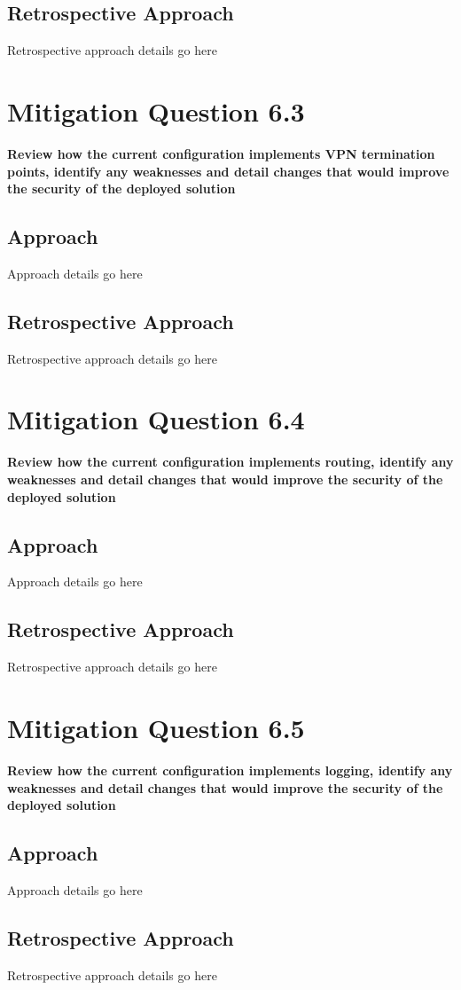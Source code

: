 \subsection{Retrospective Approach}
Retrospective approach details go here

\section{Mitigation Question 6.3}
\textbf{Review how the current configuration implements VPN termination points,
identify any weaknesses and detail changes that would improve the security of
the deployed solution}
\subsection{Approach}
Approach details go here
\subsection{Retrospective Approach}
Retrospective approach details go here

\section{Mitigation Question 6.4}
\textbf{Review how the current configuration implements routing, identify any
weaknesses and detail changes that would improve the security of the deployed
solution}
\subsection{Approach}
Approach details go here
\subsection{Retrospective Approach}
Retrospective approach details go here

\section{Mitigation Question 6.5}
\textbf{Review how the current configuration implements logging, identify any
weaknesses and detail changes that would improve the security of the deployed
solution}
\subsection{Approach}
Approach details go here
\subsection{Retrospective Approach}
Retrospective approach details go here
